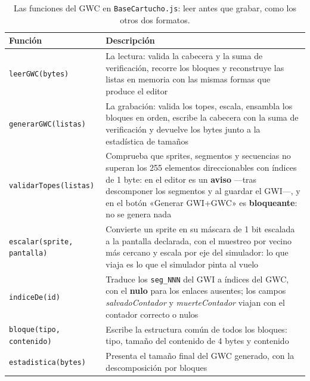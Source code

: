 \begin{table}[H]
	\centering
	\begin{tabularx}{\textwidth}{@{}l X@{}}
		\toprule
		\textbf{Función} & \textbf{Descripción} \\
		\midrule
		
		\texttt{leerGWC(bytes)} & La lectura: valida la
		cabecera y la suma de verificación, recorre los bloques y
		reconstruye las listas en memoria con las mismas formas que
		produce el editor \\
		
		\texttt{generarGWC(listas)} & La grabación: valida los
		topes, escala, ensambla los bloques en orden, escribe la
		cabecera con la suma de verificación y devuelve los bytes
		junto a la estadística de tamaños \\
		
		\texttt{validarTopes(listas)} & Comprueba que sprites,
		segmentos y secuencias no superan los 255 elementos
		direccionables con índices de 1 byte: en el editor es un
		\textbf{aviso} —tras descomponer los segmentos y al guardar
		el GWI—, y en el botón «Generar GWI+GWC» es
		\textbf{bloqueante}: no se genera nada \\
		
		\texttt{escalar(sprite, pantalla)} & Convierte un sprite en
		su máscara de 1 bit escalada a la pantalla declarada, con el
		muestreo por vecino más cercano y escala por eje del
		simulador: lo que viaja es lo que el simulador pinta al vuelo \\
		
		\texttt{indiceDe(id)} & Traduce los \texttt{seg\_NNN} del
		GWI a índices del GWC, con el \textbf{nulo} para los enlaces
		ausentes; los campos \emph{salvadoContador} y
		\emph{muerteContador} viajan con el contador correcto o
		nulos \\
		
		\texttt{bloque(tipo, contenido)} & Escribe la estructura
		común de todos los bloques: tipo, tamaño del contenido de 4
		bytes y contenido \\
		
		\texttt{estadistica(bytes)} & Presenta el tamaño final del
		GWC generado, con la descomposición por bloques \\
		\bottomrule
	\end{tabularx}
	\caption{Las funciones del GWC en \texttt{BaseCartucho.js}: leer antes que grabar, como los otros dos formatos.}
	\label{tab:funcionesGWC}
\end{table}

